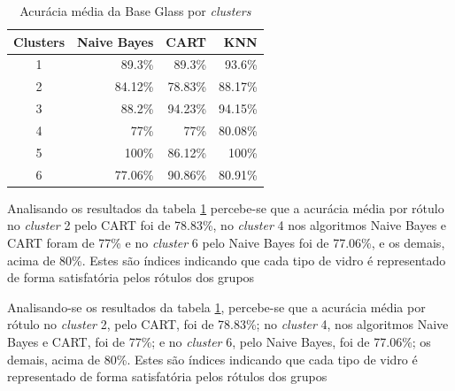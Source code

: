 \begin{table}[!ht]
\centering
\caption{Acurácia média da Base Glass por \textit{clusters}}
\label{tab:acuracia:glass}
\begin{tabular}{c|r|r|r}
\hline
\rowcolor[HTML]{EFEFEF}
\textbf{Clusters} & \textbf{Naive Bayes} & \textbf{CART} & \textbf{KNN} \\ \hline
    1            & 89.3\%    &  89.3\% &    93.6\%     \\
    2            & 84.12\%  & 78.83\% &  88.17\%     \\
    3            & 88.2\%   & 94.23\% & 94.15\%   \\
    4            & 77\%     &  77\%     & 80.08\%   \\
    5            & 100\%    & 86.12\% &   100\% \\
    6            &  77.06\% & 90.86\%   &  80.91\%  \\
    
\end{tabular}
\end{table}



Analisando os resultados da tabela \ref{tab:acuracia:glass} percebe-se que a acurácia média por rótulo no \textit{cluster} 2 pelo CART foi de 78.83\%, no \textit{cluster} 4 nos algoritmos Naive Bayes e CART foram de 77\% e no \textit{cluster} 6 pelo Naive Bayes foi de 77.06\%, e os demais, acima de 80\%. Estes são índices indicando que cada tipo de vidro  é representado de forma satisfatória pelos rótulos dos grupos


Analisando-se os resultados da tabela \ref{tab:acuracia:glass}, percebe-se que a acurácia média por rótulo no \textit{cluster} 2, pelo CART, foi de 78.83\%; no \textit{cluster} 4, nos algoritmos Naive Bayes e CART, foi de 77\%; e no \textit{cluster} 6, pelo Naive Bayes, foi de 77.06\%; os demais, acima de 80\%. Estes são índices indicando que cada tipo de vidro é representado de forma satisfatória pelos rótulos dos grupos 



